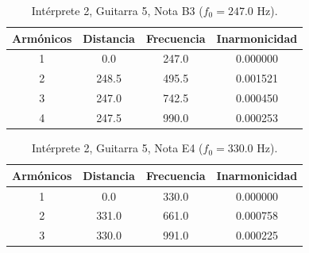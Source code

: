 \begin{table}[htbp]
  \centering
 \small
  \caption{Intérprete 2, Guitarra 5, Nota B3 ($f_0 = 247.0$ Hz).}
  \label{tab:interprete2_g5_b3}
  \begin{tabular}{cccc}
  \toprule
  Armónicos & Distancia & Frecuencia & Inarmonicidad \\
  \midrule
  1 & 0.0 & 247.0 & 0.000000 \\
  2 & 248.5 & 495.5 & 0.001521 \\
  3 & 247.0 & 742.5 & 0.000450 \\
  4 & 247.5 & 990.0 & 0.000253 \\
  \bottomrule
  \end{tabular}
\end{table}

\begin{table}[htbp]
  \centering
 \small
  \caption{Intérprete 2, Guitarra 5, Nota E4 ($f_0 = 330.0$ Hz).}
  \label{tab:interprete2_g5_e4}
  \begin{tabular}{cccc}
  \toprule
  Armónicos & Distancia & Frecuencia & Inarmonicidad \\
  \midrule
  1 & 0.0 & 330.0 & 0.000000 \\
  2 & 331.0 & 661.0 & 0.000758 \\
  3 & 330.0 & 991.0 & 0.000225 \\
  \bottomrule
  \end{tabular}
\end{table}

